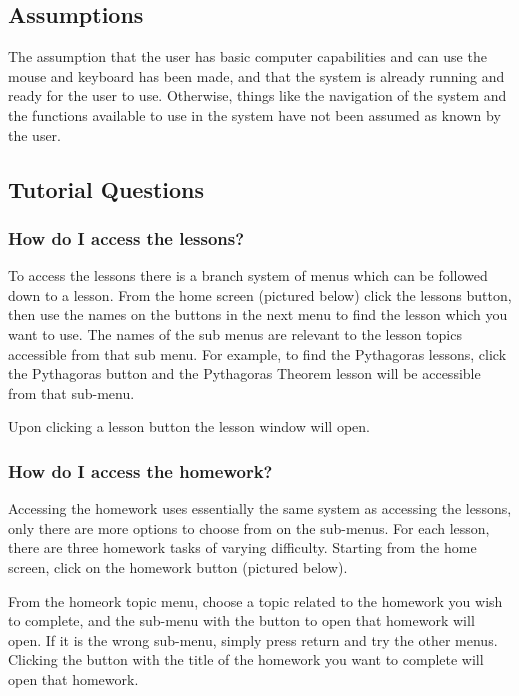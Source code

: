 \subsection{Assumptions}

The assumption that the user has basic computer capabilities and can use the mouse and keyboard has been made, and that the system is already running and ready for the user to use. Otherwise, things like the navigation of the system and the functions available to use in the system have not been assumed as known by the user.





\subsection{Tutorial Questions}

\subsubsection{How do I access the lessons?}

To access the lessons there is a branch system of menus which can be followed down to a lesson. From the home screen (pictured below) click the lessons button, then use the names on the buttons in the next menu to find the lesson which you want to use. The names of the sub menus are relevant to the lesson topics accessible from that sub menu. For example, to find the Pythagoras lessons, click the Pythagoras button and the Pythagoras Theorem lesson will be accessible from that sub-menu.


Upon clicking a lesson button the lesson window will open.


\subsubsection{How do I access the homework?}

Accessing the homework uses essentially the same system as accessing the lessons, only there are more options to choose from on the sub-menus. For each lesson, there are three homework tasks of varying difficulty. Starting from the home screen, click on the homework button (pictured below).


From the homeork topic menu, choose a topic related to the homework you wish to complete, and the sub-menu with the button to open that homework will open. If it is the wrong sub-menu, simply press return and try the other menus. Clicking the button with the title of the homework you want to complete will open that homework.

